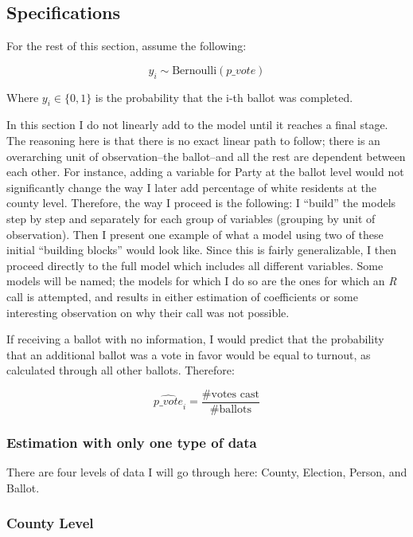 \documentclass[12pt,twoside]{reedthesis}
\begin{document}
  \subsection{Specifications}\label{specifications-1}
  
  For the rest of this section, assume the following:
  
  \[y_i \sim \text{Bernoulli}(p\_vote)\]
  
  Where \(y_i \in \{0,1\}\) is the probability that the i-th ballot was
  completed.
  
  In this section I do not linearly add to the model until it reaches a
  final stage. The reasoning here is that there is no exact linear path to
  follow; there is an overarching unit of observation--the ballot--and all
  the rest are dependent between each other. For instance, adding a
  variable for Party at the ballot level would not significantly change
  the way I later add percentage of white residents at the county level.
  Therefore, the way I proceed is the following: I ``build'' the models
  step by step and separately for each group of variables (grouping by
  unit of observation). Then I present one example of what a model using
  two of these initial ``building blocks'' would look like. Since this is
  fairly generalizable, I then proceed directly to the full model which
  includes all different variables. Some models will be named; the models
  for which I do so are the ones for which an \textit{R} call is
  attempted, and results in either estimation of coefficients or some
  interesting observation on why their call was not possible.
  
  If receiving a ballot with no information, I would predict that the
  probability that an additional ballot was a vote in favor would be equal
  to turnout, as calculated through all other ballots. Therefore:
  
  \[\hat{p\_vote}_i = \frac{\# \text{votes cast}}{\# \text{ballots}}\]
  
  \subsubsection{Estimation with only one type of
  data}\label{estimation-with-only-one-type-of-data}
  
  There are four levels of data I will go through here: County, Election,
  Person, and Ballot.
  
  \subsubsection{County Level}\label{county-level}
  
\end{document}
